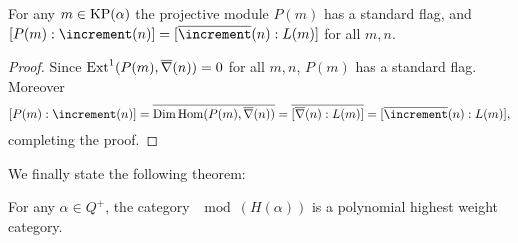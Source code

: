\begin{corollary}
    For any $m\in\operatorname{KP}(\alpha)$ the projective module $P(m)$ has a 
    standard flag, and $[P(m):\std(n)] = [\pstd(n):L(m)]$ for all $m,n$.
\end{corollary}

\begin{proof}
    Since $\operatorname{Ext}^1(P(m),\overline{\nabla}(n)) = 0$ for all $m,n$, $P(m)$
    has a standard flag. Moreover 
    \[
        [P(m):\std(n)]
         = \overline{\Dim\Hom(P(m),\pcostd(n))} = \overline{[\pcostd(n):L(m)]}
         = [\pstd(n):L(m)],
    \]
    completing the proof.
\end{proof}

We finally state the following theorem:

\begin{theorem}\cite[Theorem 6.11]{Mc2}\label{p-h-w-c}
    For any $\alpha\in Q^+$, the category $\mod(H(\alpha))$ is a 
    polynomial highest weight category.
\end{theorem}

